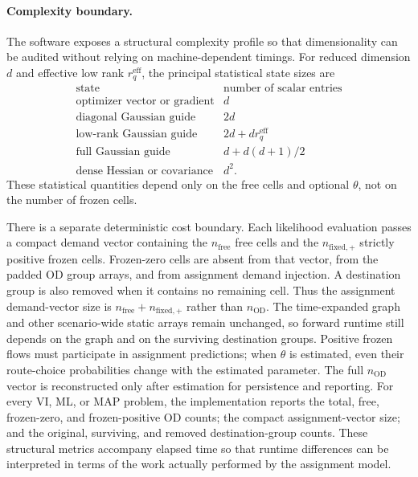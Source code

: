 \paragraph{Complexity boundary.}
The software exposes a structural complexity profile so that dimensionality can
be audited without relying on machine-dependent timings. For reduced dimension
$d$ and effective low rank $r_q^{\mathrm{eff}}$, the principal statistical
state sizes are
\[
\begin{array}{c|c}
\text{state} & \text{number of scalar entries}\\ \hline
\text{optimizer vector or gradient} & d\\
\text{diagonal Gaussian guide} & 2d\\
\text{low-rank Gaussian guide} & 2d+d r_q^{\mathrm{eff}}\\
\text{full Gaussian guide} & d+d(d+1)/2\\
\text{dense Hessian or covariance} & d^2.
\end{array}
\]
These statistical quantities depend only on the free cells and optional
$\theta$, not on the number of frozen cells.

There is a separate deterministic cost boundary. Each likelihood evaluation
passes a compact demand vector containing the $n_{\mathrm{free}}$ free cells and
the $n_{\mathrm{fixed},+}$ strictly positive frozen cells. Frozen-zero cells are
absent from that vector, from the padded OD group arrays, and from assignment
demand injection. A destination group is also removed when it contains no
remaining cell. Thus the assignment demand-vector size is
$n_{\mathrm{free}}+n_{\mathrm{fixed},+}$ rather than $n_{\mathrm{OD}}$.
The time-expanded graph and other scenario-wide static arrays remain unchanged,
so forward runtime still depends on the graph and on the surviving destination
groups. Positive frozen flows must participate in assignment predictions; when
$\theta$ is estimated, even their route-choice probabilities change with the
estimated parameter. The full $n_{\mathrm{OD}}$ vector is reconstructed only
after estimation for persistence and reporting.
For every VI, ML, or MAP problem, the implementation reports the total, free,
frozen-zero, and frozen-positive OD counts; the compact assignment-vector size;
and the original, surviving, and removed destination-group counts. These
structural metrics accompany elapsed time so that runtime differences can be
interpreted in terms of the work actually performed by the assignment model.

